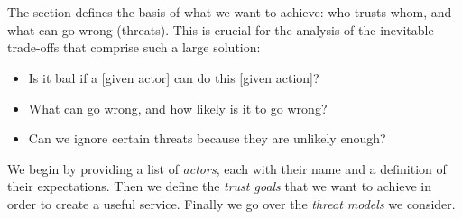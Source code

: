 \section{\rot}

The \rot section defines the basis of what we want to achieve: who trusts whom, and what can go wrong (threats).
This is crucial for the analysis of the inevitable trade-offs that comprise such a large solution:

\begin{itemize}
    \item Is it bad if a [given actor] can do this [given action]?
    \item What can go wrong, and how likely is it to go wrong?
    \item Can we ignore certain threats because they are unlikely enough?
\end{itemize}

We begin by providing a list of \emph{actors}, each with their name and a definition of their expectations.
Then we define the \emph{trust goals} that we want to achieve in order to create a useful service.
Finally we go over the \emph{threat models} we consider.




